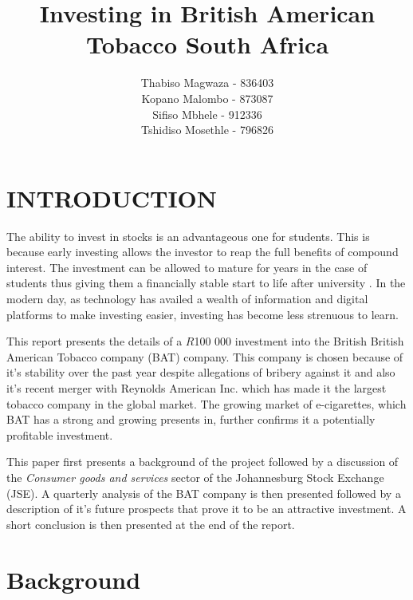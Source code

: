 \documentclass[letterpaper, 10 pt, conference]{ieeeconf}  %
\title{\LARGE \bf
Investing in British American Tobacco South Africa 
}
\author{Thabiso Magwaza - 836403 \\ Kopano Malombo - 873087\\ Sifiso Mbhele - 912336 \\ Tshidiso Mosethle - 796826 }
\begin{document}
\maketitle
\thispagestyle{empty}
\pagestyle{empty}


\begin{abstract}

\end{abstract}


\section{INTRODUCTION}

The ability to invest in stocks is an advantageous one for students. This is because early investing allows the investor to reap the full benefits of compound interest. The investment can be allowed to mature for years in the case of students thus giving them a financially stable start to life after university \cite{earlyInvestment}. In the modern day, as technology has availed a wealth of information and digital platforms to make investing easier, investing has become less strenuous to learn. 

This report presents the details of a $R$100 000 investment into the British British American Tobacco company (BAT) company. This company is chosen because of it's stability over the past year despite allegations of bribery against it and also it's recent merger with Reynolds American Inc. which has made it the largest tobacco company in the global market. The growing market of e-cigarettes, which BAT has a strong and growing presents in, further confirms it a potentially profitable investment.

This paper first presents a background of the project followed by a discussion of the \textit{Consumer goods and services} sector of the Johannesburg Stock Exchange (JSE). A quarterly analysis of the BAT company is then presented followed by a description of it's future prospects that prove it to be an attractive investment. A short conclusion is then presented at the end of the report. 

\section{Background}
\end{document}
